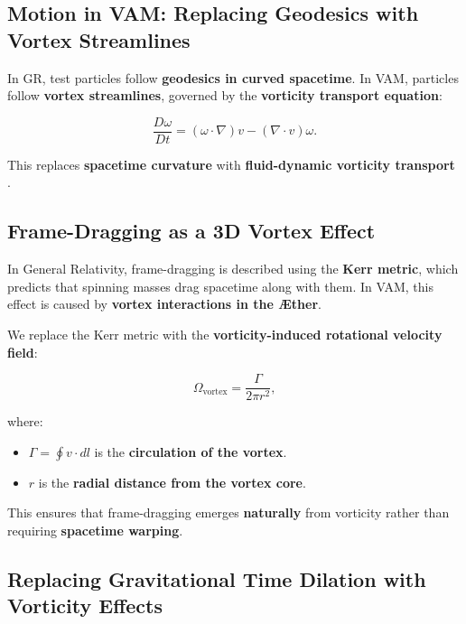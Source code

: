     \subsection{Motion in VAM: Replacing Geodesics with Vortex Streamlines}

    In GR, test particles follow \textbf{geodesics in curved spacetime}. In VAM, particles follow \textbf{vortex streamlines}, governed by the \textbf{vorticity transport equation}:

    \begin{equation*}
        \frac{D\omega}{Dt} = (\omega \cdot \nabla) v - (\nabla \cdot v) \omega.
    \end{equation*}

    This replaces \textbf{spacetime curvature} with \textbf{fluid-dynamic vorticity transport} \cite{lamb_hydrodynamics, feynman_superfluid}.



    \subsection*{Frame-Dragging as a 3D Vortex Effect}

    In General Relativity, frame-dragging is described using the \textbf{Kerr metric}, which predicts that spinning masses drag spacetime along with them. In VAM, this effect is caused by \textbf{vortex interactions in the Æther}.

    We replace the Kerr metric with the \textbf{vorticity-induced rotational velocity field}:

    \begin{equation*}
        \Omega_\text{vortex} = \frac{\Gamma}{2\pi r^2},
    \end{equation*}

    where:
    \begin{itemize}
        \item \( \Gamma = \oint v \cdot dl \) is the \textbf{circulation of the vortex}.
        \item \( r \) is the \textbf{radial distance from the vortex core}.
    \end{itemize}

    This ensures that frame-dragging emerges \textbf{naturally} from vorticity rather than requiring \textbf{spacetime warping}.



    \subsection{Replacing Gravitational Time Dilation with Vorticity Effects}

